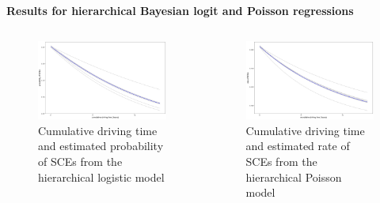 \documentclass[aspectratio=43]{beamer}
\begin{document}
\begin{frame}{\textbf{Results for hierarchical Bayesian logit and Poisson regressions}}
\begin{columns}
\begin{column}{.45\textwidth}
\begin{figure}
  \includegraphics[width=\textwidth]{Figures/fit_logit.png}
  \caption{Cumulative driving time and estimated probability of SCEs from the hierarchical logistic model}
\end{figure}
\end{column}
\hfill
\begin{column}{.45\textwidth}
\begin{figure}
  \includegraphics[width=\textwidth]{Figures/fit_Poisson.png}
  \caption{Cumulative driving time and estimated rate of SCEs from the hierarchical Poisson model}
\end{figure}
\end{column}
\end{columns}
\end{frame}
\end{document}
